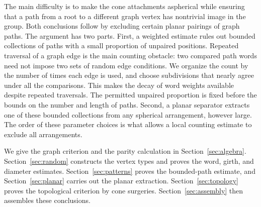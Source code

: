 The main difficulty is to make the cone attachments aspherical while ensuring
that a path from a root to a different graph vertex has nontrivial image in
the group. Both conclusions follow by excluding certain planar pairings of
graph paths. The argument has two parts. First, a weighted estimate rules out
bounded collections of paths with a small proportion of unpaired positions.
Repeated traversal of a graph edge is the main counting obstacle: two
compared path words need not impose two sets of random edge conditions.
We organize the count by the number of times each edge is used, and choose
subdivisions that nearly agree under all the comparisons. This makes the
decay of word weights available despite repeated traversals. The permitted
unpaired proportion is fixed before the bounds on the number and length of
paths. Second, a planar separator extracts one of these bounded collections
from any spherical arrangement, however large. The order of these parameter
choices is what allows a local counting estimate to exclude all arrangements.

We give the graph criterion and the parity calculation in
Section~\ref{sec:algebra}. Section~\ref{sec:random} constructs the vertex types
and proves the word, girth, and diameter estimates.
Section~\ref{sec:patterns} proves the bounded-path estimate, and
Section~\ref{sec:planar} carries out the planar extraction.
Section~\ref{sec:topology} proves the topological criterion by cone surgeries.
Section~\ref{sec:assembly} then assembles these conclusions.
